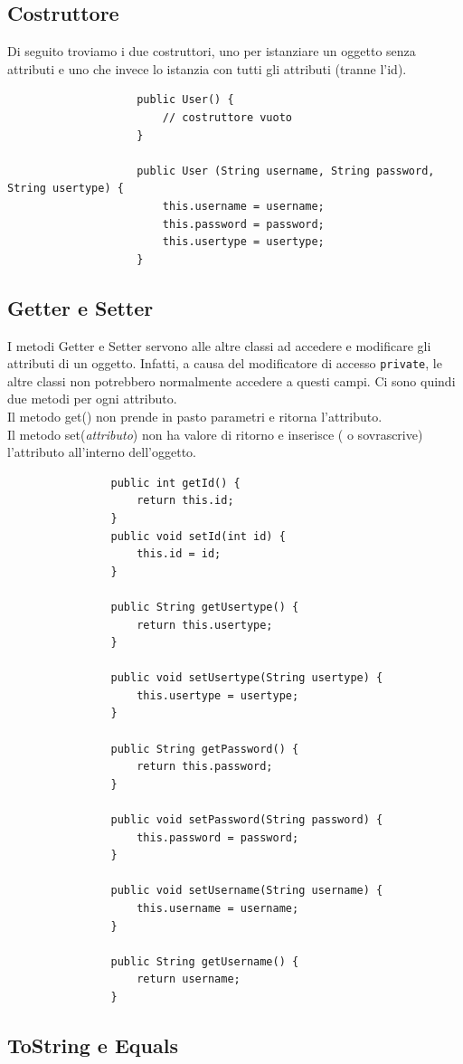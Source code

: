 \documentclass[a4paper,12 pt]{article}
\begin{document}
			\subsection{Costruttore}
			Di seguito troviamo i due costruttori, uno per istanziare un oggetto senza attributi e uno che invece lo istanzia con tutti gli attributi (tranne l'id).
				\begin{lstlisting}
					public User() {
						// costruttore vuoto
					}
					
					public User (String username, String password, String usertype) {
						this.username = username;
						this.password = password;
						this.usertype = usertype;
					}	
				\end{lstlisting}
				
			\subsection{Getter e Setter}
			I metodi Getter e Setter servono alle altre classi ad accedere e modificare gli attributi di un oggetto. Infatti, a causa del modificatore di accesso \texttt{private}, le altre classi non potrebbero normalmente accedere a questi campi. Ci sono quindi due metodi per ogni attributo.\\
			 Il metodo get() non prende in pasto parametri e ritorna l'attributo.\\
			  Il metodo set(\textit{attributo}) non ha valore di ritorno e inserisce ( o sovrascrive) l'attributo all'interno dell'oggetto.
				\begin{lstlisting}
				public int getId() {
					return this.id;
				}
				public void setId(int id) {
					this.id = id;
				}
				
				public String getUsertype() {
					return this.usertype;
				}
				
				public void setUsertype(String usertype) {
					this.usertype = usertype;
				}
				
				public String getPassword() {
					return this.password;
				}
				
				public void setPassword(String password) {
					this.password = password;
				}
				
				public void setUsername(String username) {
					this.username = username;
				}
				
				public String getUsername() {
					return username;
				}
				\end{lstlisting}
				
				\subsection{ToString e Equals}
				
\end{document}
